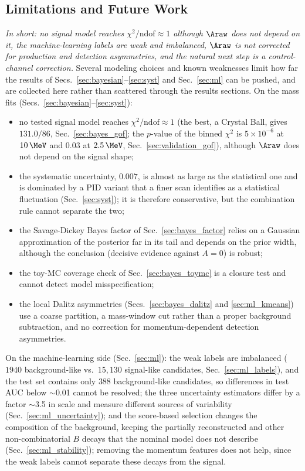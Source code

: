 \subsection{Limitations and Future Work}
\label{sec:limitations}
\emph{In short: no signal model reaches $\chi^2/\mathrm{ndof}\approx1$ although $\Araw$ does not depend on it, the machine-learning labels are weak and imbalanced, $\Araw$ is not corrected for production and detection asymmetries, and the natural next step is a control-channel correction.}
Several modeling choices and known weaknesses limit how far the results of Secs.~\ref{sec:bayesian}--\ref{sec:syst} and Sec.~\ref{sec:ml} can be pushed, and are collected here rather than scattered through the results sections.
On the mass fits (Secs.~\ref{sec:bayesian}--\ref{sec:syst}):
\begin{itemize}[leftmargin=*,itemsep=2pt]
\item no tested signal model reaches $\chi^2/\mathrm{ndof}\approx1$ (the best, a Crystal Ball, gives $131.0/86$, Sec.~\ref{sec:bayes_gof}; the $p$-value of the binned $\chi^2$ is $5\times10^{-6}$ at $10\,\MeV$ and $0.03$ at $2.5\,\MeV$, Sec.~\ref{sec:validation_gof}), although $\Araw$ does not depend on the signal shape;
\item the systematic uncertainty, $0.007$, is almost as large as the statistical one and is dominated by a PID variant that a finer scan identifies as a statistical fluctuation (Sec.~\ref{sec:syst}); it is therefore conservative, but the combination rule cannot separate the two;
\item the Savage-Dickey Bayes factor of Sec.~\ref{sec:bayes_factor} relies on a Gaussian approximation of the posterior far in its tail and depends on the prior width, although the conclusion (decisive evidence against $A=0$) is robust;
\item the toy-MC coverage check of Sec.~\ref{sec:bayes_toymc} is a closure test and cannot detect model misspecification;
\item the local Dalitz asymmetries (Secs.~\ref{sec:bayes_dalitz} and \ref{sec:ml_kmeans}) use a coarse partition, a mass-window cut rather than a proper background subtraction, and no correction for momentum-dependent detection asymmetries.
\end{itemize}
On the machine-learning side (Sec.~\ref{sec:ml}): the weak labels are imbalanced ($1940$ background-like vs.\ $15{,}130$ signal-like candidates, Sec.~\ref{sec:ml_labels}), and the test set contains only $388$ background-like candidates, so differences in test AUC below $\sim$0.01 cannot be resolved; the three uncertainty estimators differ by a factor $\sim$3.5 in scale and measure different sources of variability (Sec.~\ref{sec:ml_uncertainty}); and the score-based selection changes the composition of the background, keeping the partially reconstructed and other non-combinatorial $B$ decays that the nominal model does not describe (Sec.~\ref{sec:ml_stability}); removing the momentum features does not help, since the weak labels cannot separate these decays from the signal.
